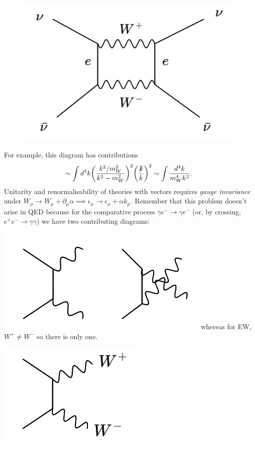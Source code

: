 %
\begin{figure}
  \centering
  \includegraphics[width=\linewidth]{figs/18b.png}
\end{figure}
%
For example, this diagram has contributions
\begin{equation}
\sim \int d^4k \bigg(\frac{k^2/m_W^2}{k^2-m_W^2}\bigg)^2 \bigg(\frac{\slashed{k}}{k}\bigg)^2 \sim \int \frac{d^4k}{m_W^4k^2}.
\end{equation}
Unitarity and renormalisability of theories with vectors requires \textit{gauge invariance} under $W_\mu \to W_\mu + \partial_\mu \alpha \implies \epsilon_\mu \to \epsilon_\mu + \alpha k_\mu$. 
Remember that this problem doesn't arise in QED because for the comparative process $\gamma e^- \to \gamma e^-$ (or, by crossing, $e^+e^- \to \gamma \gamma$) we have two contributing diagrams:

%
  \includegraphics[width=0.8\linewidth]{figs/18c.png}
%
\newline
whereas for EW, $W^+ \neq W^-$ so there is only one.

%
  \includegraphics[width=0.3\linewidth]{figs/18d.png}
%
